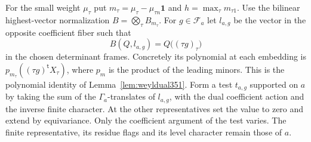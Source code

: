 \documentclass[a4paper,11pt]{article}
\theoremstyle{definition}
\theoremstyle{remark}
\numberwithin{equation}{section}
\begin{document}
For the small weight \(\mu_\tau\) put
\(m_\tau=\mu_\tau-\mu_{\tau n}\mathbf 1\) and
\(h=\max_\tau m_{\tau1}\). Use the bilinear highest-vector
normalization \(B=\bigotimes_\tau B_{m_\tau}\). For \(g\in\mathcal F_a\)
let \(l_{a,g}\) be the vector in the opposite coefficient fiber such that
\[
             B(Q,l_{a,g})=Q\big((\tau g)_\tau\big)
\]
in the chosen determinant frames. Concretely its polynomial at each
embedding is \(p_{m_\tau}((\tau g)^{\mathsf t}X_\tau)\), where
\(p_m\) is the product of the leading minors. This is the polynomial
identity of Lemma~\ref{lem:weyldual351}. Form a test \(t_{a,g}\)
supported on \(a\) by taking the sum of the \(\Gamma_a\)-translates
of \(l_{a,g}\), with the dual coefficient action and the inverse
finite character. At the other representatives set the value to zero
and extend by equivariance. Only the coefficient argument of the test
varies. The finite representative, its residue flags and its level
character remain those of \(a\).
\end{document}
